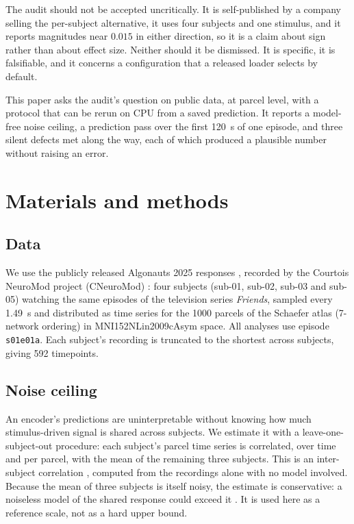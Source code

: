 \documentclass[preprint,12pt]{elsarticle}
\begin{document}
The audit should not be accepted uncritically. It is self-published by a company selling the
per-subject alternative, it uses four subjects and one stimulus, and it reports magnitudes
near $0.015$ in either direction, so it is a claim about sign rather than about effect size.
Neither should it be dismissed. It is specific, it is falsifiable, and it concerns a
configuration that a released loader selects by default.

This paper asks the audit's question on public data, at parcel level, with a protocol that can
be rerun on CPU from a saved prediction. It reports a model-free noise ceiling, a prediction
pass over the first 120~s of one episode, and three silent defects met along the way, each of
which produced a plausible number without raising an error.

\section{Materials and methods}
\label{sec:methods}

\subsection{Data}

We use the publicly released Algonauts 2025 responses \cite{algonauts2025}, recorded by the
Courtois NeuroMod project (CNeuroMod) \cite{cneuromod2023}: four subjects (sub-01, sub-02,
sub-03 and sub-05) watching the same episodes of the television series \emph{Friends}, sampled
every 1.49~s and distributed as time series for the 1000 parcels of the Schaefer atlas
\cite{schaefer2018} (7-network ordering) in MNI152NLin2009cAsym space. All analyses use
episode \texttt{s01e01a}. Each subject's recording is truncated to the shortest across
subjects, giving 592 timepoints.

\subsection{Noise ceiling}

An encoder's predictions are uninterpretable without knowing how much stimulus-driven signal
is shared across subjects. We estimate it with a leave-one-subject-out procedure: each
subject's parcel time series is correlated, over time and per parcel, with the mean of the
remaining three subjects. This is an inter-subject correlation \cite{nastase2019}, computed
from the recordings alone with no model involved. Because the mean of three subjects is itself
noisy, the estimate is conservative: a noiseless model of the shared response could exceed it
\cite{hsu2004,lagecastellanos2019}. It is used here as a reference scale, not as a hard upper
bound.
\end{document}
